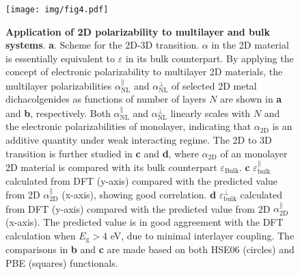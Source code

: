 \documentclass[journal=ancac3,manuscript=article,email=true,hyperref=true,keywords=false]{achemso}
\begin{document}

\begin{figure}[H]
\centering
\texttt{[image: img/fig4.pdf]}
\caption{\label{fig-4} \textbf{Application of 2D polarizability to
    multilayer and bulk systems}.  \textbf{a}. Scheme for the 2D-3D
  transition. $\alpha$ in the 2D material is essentially equivalent to
  $\varepsilon$ in its bulk counterpart.  By applying the concept of
  electronic polarizability to multilayer 2D materials, the multilayer
  polarizabilities $\alpha_{\mathrm{NL}}^{\parallel}$ and
  $\alpha_{\mathrm{NL}}^{\perp}$ of selected 2D metal dichacolgenides
  as functions of number of layers $N$ are shown in \textbf{a} and
  \textbf{b}, respectively. Both $\alpha_{\mathrm{NL}}^{\parallel}$
  and $\alpha_{\mathrm{NL}}^{\perp}$ linearly scales with $N$ and the
  electronic polarizabilities of monolayer, indicating that
  $\alpha_{\mathrm{2D}}$ is an additive quantity under weak
  interacting regime. The 2D to 3D transition is further studied in
  \textbf{c} and \textbf{d}, where $\alpha_{\mathrm{2D}}$ of an
  monolayer 2D material is compared with its bulk counterpart
  $\varepsilon_{\mathrm{Bulk}}$. \textbf{c}
  $\varepsilon_{\mathrm{bulk}}^{\parallel}$ calculated from DFT
  (y-axis) compared with the predicted value from 2D
  $\alpha_{\mathrm{2D}}^{\parallel}$ (x-axis), showing good
  correlation. \textbf{d} $\varepsilon_{\mathrm{bulk}}^{\perp}$
  calculated from DFT (y-axis) compared with the predicted value from
  2D $\alpha_{\mathrm{2D}}^{\parallel}$ (x-axis). The predicted value
  is in good aggreement with the DFT calculation when
  $E_{\mathrm{g}}>4$ eV, due to minimal interlayer coupling. The
  comparisons in \textbf{b} and \textbf{c} are made based on both
  HSE06 (circles) and PBE (squares) functionals.}
\end{figure}
\end{document}
